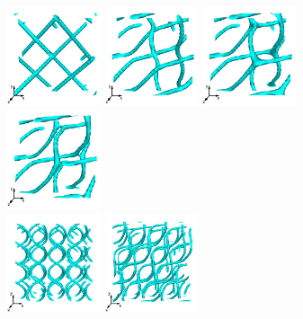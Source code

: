 \documentclass[8.5pt,twoside,twocolumn]{article}
\begin{document}
\begin{figure}[htpb]
\includegraphics[width=0.245\textwidth]{disc-xy-10k_run1115r.png}
\includegraphics[width=0.245\textwidth]{disc-xy-180k_run1115r.png}
\includegraphics[width=0.245\textwidth]{disc-xy-200k_run1115r.png}
\includegraphics[width=0.245\textwidth]{disc-xy-210k_run1115r.png}\\
\includegraphics[width=0.245\textwidth]{disc-xy-1650k_run1115r.png}
\includegraphics[width=0.245\textwidth]{disc-xy-1800k_run1115r.png}

\end{figure}
\end{document}
